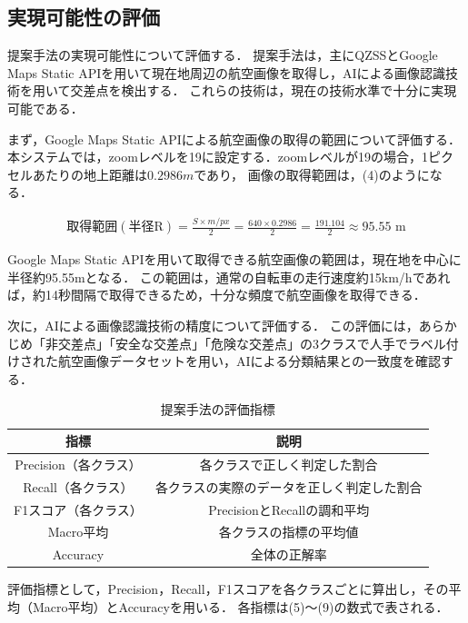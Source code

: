 \documentclass[uplatex,dvipdfmx]{jsarticle}
\begin{document}
\subsection{実現可能性の評価}
提案手法の実現可能性について評価する．
提案手法は，主にQZSSとGoogle Maps Static APIを用いて現在地周辺の航空画像を取得し，AIによる画像認識技術を用いて交差点を検出する．
これらの技術は，現在の技術水準で十分に実現可能である．

まず，Google Maps Static APIによる航空画像の取得の範囲について評価する．
本システムでは，zoomレベルを19に設定する．zoomレベルが19の場合，1ピクセルあたりの地上距離は$0.2986m$であり，
画像の取得範囲は，(4)のようになる\cite{ref:zoomrevel}．

\begin{align}
\mathrm{取得範囲(半径R)} = \frac{S\times m/px}{2} = \frac{640 \times 0.2986}{2} = \frac{191.104}{2} ≈ 95.55 \text{ m}
\end{align}

Google Maps Static APIを用いて取得できる航空画像の範囲は，現在地を中心に半径約95.55mとなる．
この範囲は，通常の自転車の走行速度約15km/hであれば，約14秒間隔で取得できるため，十分な頻度で航空画像を取得できる．

次に，AIによる画像認識技術の精度について評価する．
この評価には，あらかじめ「非交差点」「安全な交差点」「危険な交差点」の3クラスで人手でラベル付けされた航空画像データセットを用い，AIによる分類結果との一致度を確認する．

\begin{table}[H]
  \centering
  \caption{提案手法の評価指標}
  \label{tab:evaluation_metrics}
  \begin{tabular}{|c|c|}
    \hline
    指標 & 説明 \\ \hline
    Precision（各クラス） & 各クラスで正しく判定した割合 \\ \hline
    Recall（各クラス） & 各クラスの実際のデータを正しく判定した割合 \\ \hline
    F1スコア（各クラス） & PrecisionとRecallの調和平均 \\ \hline
    Macro平均 & 各クラスの指標の平均値 \\ \hline
    Accuracy & 全体の正解率 \\ \hline
  \end{tabular}
\end{table}

評価指標として，Precision，Recall，F1スコアを各クラスごとに算出し，その平均（Macro平均）とAccuracyを用いる．
各指標は(5)〜(9)の数式で表される．
\end{document}
